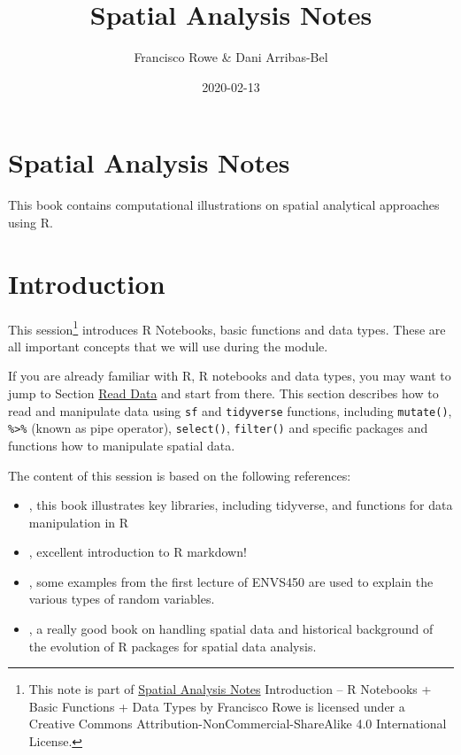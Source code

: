 \documentclass[]{book}
\title{Spatial Analysis Notes}
\author{Francisco Rowe \& Dani Arribas-Bel}
\date{2020-02-13}
\let\rmarkdownfootnote\footnote%
\def\footnote{\protect\rmarkdownfootnote}
\begin{document}
\maketitle

{
\setcounter{tocdepth}{1}
\tableofcontents
}
\hypertarget{spatial-analysis-notes}{%
\chapter{Spatial Analysis Notes}\label{spatial-analysis-notes}}

This book contains computational illustrations on spatial analytical approaches using R.

\hypertarget{intro}{%
\chapter{Introduction}\label{intro}}

This session\footnote{This note is part of \href{index.html}{Spatial Analysis Notes} {Introduction -- R Notebooks + Basic Functions + Data Types} by Francisco Rowe is licensed under a Creative Commons Attribution-NonCommercial-ShareAlike 4.0 International License.} introduces R Notebooks, basic functions and data types. These are all important concepts that we will use during the module.

If you are already familiar with R, R notebooks and data types, you may want to jump to Section \protect\hyperlink{sec_readdata}{Read Data} and start from there. This section describes how to read and manipulate data using \texttt{sf} and \texttt{tidyverse} functions, including \texttt{mutate()}, \texttt{\%\textgreater{}\%} (known as pipe operator), \texttt{select()}, \texttt{filter()} and specific packages and functions how to manipulate spatial data.

The content of this session is based on the following references:

\begin{itemize}
\item
  \citet{grolemund_wickham_2019_book}, this book illustrates key libraries, including tidyverse, and functions for data manipulation in R
\item
  \citet{Xie_et_al_2019_book}, excellent introduction to R markdown!
\item
  \citet{envs450_2018}, some examples from the first lecture of ENVS450 are used to explain the various types of random variables.
\item
  \citet{Lovelace_et_al_2020_book}, a really good book on handling spatial data and historical background of the evolution of R packages for spatial data analysis.
\end{itemize}
\end{document}
